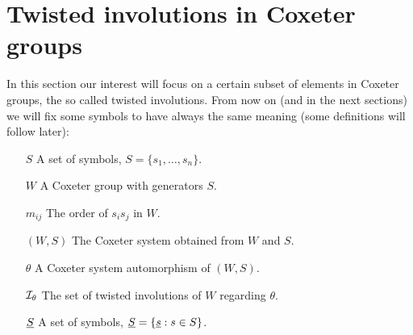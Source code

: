 \section{Twisted involutions in Coxeter groups}
\label{sec:twisted-involutions}

In this section our interest will focus on a certain subset of elements in Coxeter groups, the so called twisted involutions. From now on (and in the next sections) we will fix some symbols to have always the same meaning (some definitions will follow later):

\begin{enumerate}
	\item[$S$]				A set of symbols, $S = \{ s_1, \ldots, s_n \}$.
	\item[$W$]				A Coxeter group with generators $S$.
	\item[$m_{ij}$]			The order of $s_i s_j$ in $W$.
	\item[$(W,S)$]			The Coxeter system obtained from $W$ and $S$.
	\item[$\theta$]			A Coxeter system automorphism of $(W,S)$.
	\item[$\mathcal{I}_{\theta}$]	The set of twisted involutions of $W$ regarding $\theta$.
	\item[$\underline{S}$]			A set of symbols, $\underline{S} = \{ \underline{s} : s \in S \}$.
\end{enumerate}

